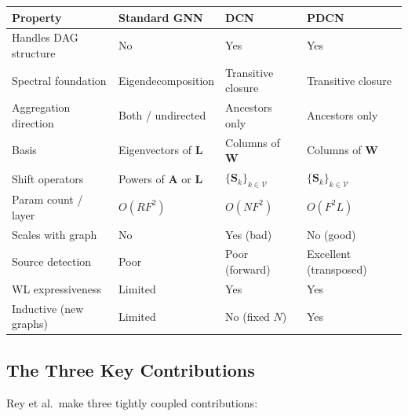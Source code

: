 \begin{center}
\begin{tabular}{llll}
\toprule
\textbf{Property} & \textbf{Standard GNN} & \textbf{DCN} & \textbf{PDCN} \\
\midrule
Handles DAG structure & No & Yes & Yes \\
Spectral foundation & Eigendecomposition & Transitive closure & Transitive closure \\
Aggregation direction & Both / undirected & Ancestors only & Ancestors only \\
Basis & Eigenvectors of $\mathbf{L}$ & Columns of $\mathbf{W}$ & Columns of $\mathbf{W}$ \\
Shift operators & Powers of $\mathbf{A}$ or $\mathbf{L}$ & $\{\mathbf{S}_k\}_{k \in \mathcal{V}}$ & $\{\mathbf{S}_k\}_{k \in \mathcal{V}}$ \\
Param count / layer & $O(RF^2)$ & $O(NF^2)$ & $O(F^2L)$ \\
Scales with graph & No & Yes (bad) & No (good) \\
Source detection & Poor & Poor (forward) & Excellent (transposed) \\
WL expressiveness & Limited & Yes & Yes \\
Inductive (new graphs) & Limited & No (fixed $N$) & Yes \\
\bottomrule
\end{tabular}
\end{center}

\subsection{The Three Key Contributions}

Rey et al.\ make three tightly coupled contributions:

